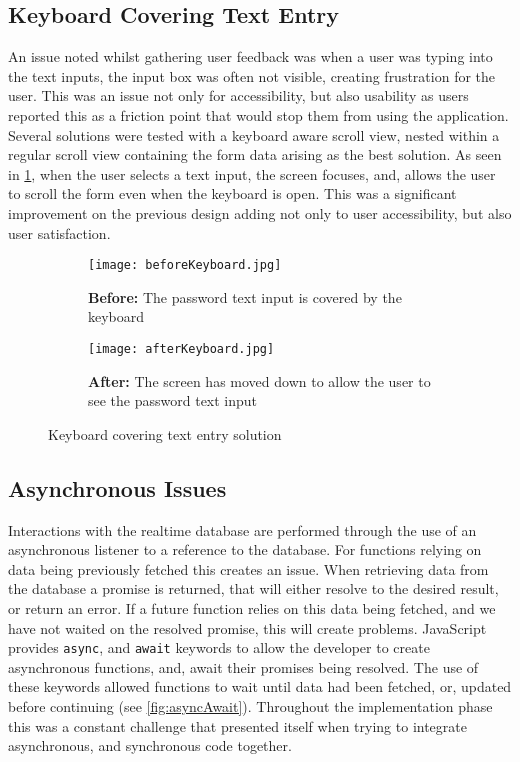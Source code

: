 \subsection*{Keyboard Covering Text Entry}
An issue noted whilst gathering user feedback was when a user was typing into the text inputs, the input box was often not visible, creating frustration for the user. This was an issue not only for accessibility, but also usability as users reported this as a friction point that would stop them from using the application. Several solutions were tested with a keyboard aware scroll view, nested within a regular scroll view containing the form data arising as the best solution. As seen in \ref{fig:keyboard}, when the user selects a text input, the screen focuses, and, allows the user to scroll the form even when the keyboard is open. This was a significant improvement on the previous design adding not only to user accessibility, but also user satisfaction.
\begin{figure}[!htbp]
    \centering
    \begin{subfigure}[b]{0.25\textwidth}
        \texttt{[image: beforeKeyboard.jpg]}
        \caption{\textbf{Before:} The password text input is covered by the keyboard}
    \end{subfigure}
    \hspace{1.5em}
    \begin{subfigure}[b]{0.25\textwidth}
        \texttt{[image: afterKeyboard.jpg]}
        \caption{\textbf{After:} The screen has moved down to  allow  the user to see the password text input}
    \end{subfigure}
    \caption{Keyboard covering text entry solution }
    \label{fig:keyboard}
\end{figure}


\subsection*{Asynchronous Issues}
Interactions with the realtime database are performed through the use of an asynchronous listener to a reference to the database. For functions relying on data being previously fetched this creates an issue. When retrieving data from the database a promise is returned, that will either resolve to the desired result, or return an error. If a future function relies on this data being fetched, and we have not waited on the resolved promise, this will create problems. JavaScript provides \texttt{async}, and \texttt{await} keywords to allow the developer to create asynchronous functions, and, await their promises being resolved. The use of these keywords allowed functions to wait until data had been fetched, or, updated before continuing (see \ref{fig:asyncAwait}). Throughout the implementation phase this was a constant challenge that presented itself when trying to integrate asynchronous, and synchronous code together.

